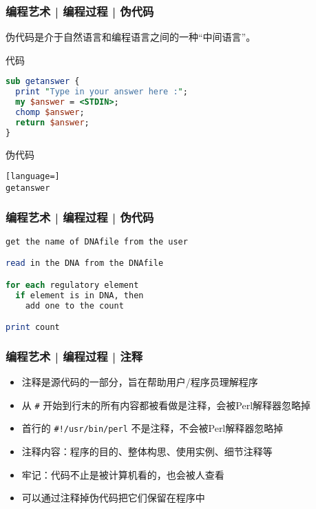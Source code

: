 \begin{frame}[fragile]
  \frametitle{编程艺术 | 编程过程 | 伪代码}
伪代码是介于自然语言和编程语言之间的一种“中间语言”。
  \begin{block}{代码}
\begin{lstlisting}[language=Perl]
sub getanswer {
  print "Type in your answer here :";  
  my $answer = <STDIN>;
  chomp $answer;
  return $answer;
}
\end{lstlisting}
\end{block}
\pause
\begin{block}{伪代码}
\begin{lstlisting}[language=]
getanswer
\end{lstlisting}
\end{block}
\end{frame}

\begin{frame}[fragile]
  \frametitle{编程艺术 | 编程过程 | \alert{伪代码}}
\begin{lstlisting}[language=Perl]
get the name of DNAfile from the user

read in the DNA from the DNAfile

for each regulatory element
  if element is in DNA, then
    add one to the count

print count
\end{lstlisting}
\end{frame}

\begin{frame}[fragile]
  \frametitle{编程艺术 | 编程过程 | \alert{注释}}
  \begin{itemize}
    \item 注释是源代码的一部分，旨在帮助用户/程序员理解程序
    \item 从 \verb|#| 开始到行末的所有内容都被看做是注释，会被Perl解释器忽略掉
    \item 首行的 \verb|#!/usr/bin/perl| 不是注释，不会被Perl解释器忽略掉
    \item 注释内容：程序的目的、整体构思、使用实例、细节注释等
    \item 牢记：代码不止是被计算机看的，也会被人查看
    \item 可以通过注释掉伪代码把它们保留在程序中
  \end{itemize}
\end{frame}

